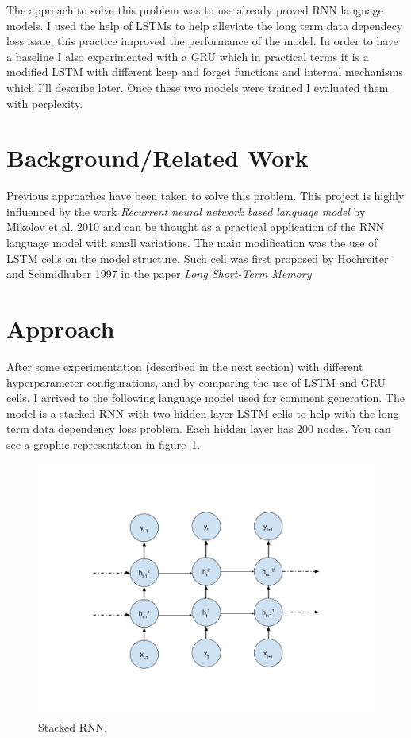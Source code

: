 \documentclass{article} %
\begin{document}
The approach to solve this problem was to use already proved RNN language
models. I used the help of LSTMs to help alleviate the long term data dependecy
loss issue, this practice improved the performance of the model. In order to have
a baseline I also experimented with a GRU which in practical terms it is a
modified LSTM with different keep and forget functions and internal mechanisms
which I'll describe later. Once these two models were trained I evaluated them
with perplexity.

\section{Background/Related Work}
Previous approaches have been taken to solve this problem. This project is
highly influenced by the work \textit{Recurrent neural network based language
model} by Mikolov et al. 2010 and can be thought as a practical application of
the RNN language model with small variations. The main modification was the use
of LSTM cells on the model structure. Such cell was first proposed by Hochreiter
and Schmidhuber 1997 in the paper \textit{Long Short-Term Memory}

\section{Approach}
After some experimentation (described in the next section) with different
hyperparameter configurations, and by comparing the use of LSTM and GRU cells. I
arrived to the following language model used for comment generation. The model
is a stacked RNN with two hidden layer LSTM cells to help with the long term
data dependency loss problem. Each hidden layer has 200 nodes. You can see a
graphic representation in figure~\ref{fig:rnndiagram}.

\begin{figure}[h]
\centering
\includegraphics[scale=0.4]{rnn_diagram}
\caption{Stacked RNN.}
\label{fig:rnndiagram}
\end{figure}
\end{document}
